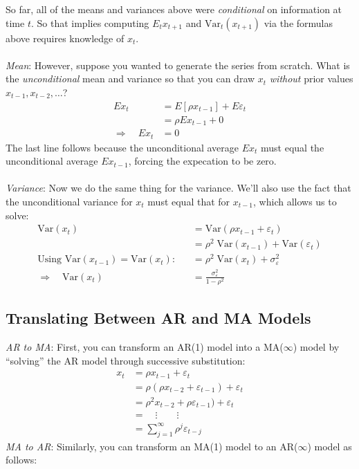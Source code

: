 \documentclass[a4paper,12pt]{scrartcl}
\begin{document}
So far, all of the means and variances above were \emph{conditional}
on information at time $t$.  So that implies computing $E_t x_{t+1}$
and $\text{Var}_t(x_{t+1})$ via the formulas above requires knowledge 
of $x_t$.
\\
\\
{\sl Mean}:
However, suppose you wanted to generate the series from scratch.  What
is the \emph{unconditional} mean and variance so that you can draw
$x_t$ \emph{without} prior values $x_{t-1}, x_{t-2}, \ldots$?
\begin{align*}
    Ex_t &= E[\rho x_{t-1}] + E\varepsilon_t \\
	&= \rho Ex_{t-1} + 0  \\
    \Rightarrow \quad Ex_t &= 0
\end{align*}
The last line follows because the unconditional average $Ex_t$ must
equal the unconditional average $Ex_{t-1}$, forcing the expecation
to be zero.
\\
\\
{\sl Variance}: Now we do the same thing for the variance. We'll
also use the fact that the unconditional variance for $x_t$ must
equal that for $x_{t-1}$, which allows us to solve:
\begin{align*}
    \text{Var}(x_{t}) &= \text{Var}(\rho x_{t-1} + \varepsilon_t) \\
    &= \rho^2 \; \text{Var}(x_{t-1}) + \text{Var}( \varepsilon_t) \\
	\text{Using $\text{Var}(x_{t-1}) = \text{Var}(x_{t})$:} \quad
    &= \rho^2 \; \text{Var}(x_{t}) + \sigma_\varepsilon^2 \\
    \Rightarrow \quad \text{Var}(x_{t}) &= 
	\frac{\sigma^2_\varepsilon}{1-\rho^2}
\end{align*}


\subsection{Translating Between AR and MA Models}

{\sl AR to MA}: First, 
you can transform an AR(1) model into a MA($\infty$) model
by ``solving'' the AR model through successive substitution:
\begin{align*}
    x_t &= \rho x_{t-1} + \varepsilon_t \\
    &= \rho (\rho x_{t-2} + \varepsilon_{t-1}) + \varepsilon_t \\
    &= \rho^2 x_{t-2} + \rho \varepsilon_{t-1}) + \varepsilon_t \\
    &= \quad \vdots \qquad \vdots \\
    &= \sum^\infty_{j=1} \rho^j \varepsilon_{t-j}
\end{align*}
{\sl MA to AR}: Similarly, you can transform an MA(1) model to
an AR($\infty$) model as follows:
\end{document}
